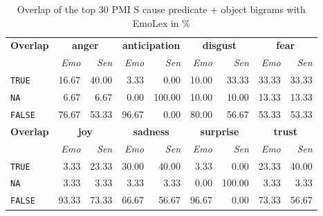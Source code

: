 \begin{table}[]
\centering
\begin{tabular}{l|rr|rr|rr|rr}
{\bf Overlap} & \multicolumn{2}{c}{{\bf anger}} & \multicolumn{2}{c}{{\bf anticipation}} & \multicolumn{2}{c}{{\bf disgust}} & \multicolumn{2}{c}{{\bf fear}} \\
 & {\it Emo} & {\it Sen} & {\it Emo} & {\it Sen} & {\it Emo} & {\it Sen} & {\it Emo} & {\it Sen} \\\hline
\texttt{TRUE} & 16.67 & 40.00 & 3.33 & 0.00 & 10.00 & 33.33 & 33.33 & 33.33 \\
\texttt{NA} & 6.67 & 6.67 & 0.00 & 100.00 & 10.00 & 10.00 & 13.33 & 13.33 \\
\texttt{FALSE} & 76.67 & 53.33 & 96.67 & 0.00 & 80.00 & 56.67 & 53.33 & 53.33 \\\hline
{\bf Overlap} & \multicolumn{2}{c}{{\bf joy}} & \multicolumn{2}{c}{{\bf sadness}} & \multicolumn{2}{c}{{\bf surprise}} & \multicolumn{2}{c}{{\bf trust}} \\
 & {\it Emo} & {\it Sen} & {\it Emo} & {\it Sen} & {\it Emo} & {\it Sen} & {\it Emo} & {\it Sen} \\\hline
\texttt{TRUE} & 3.33 & 23.33 & 30.00 & 40.00 & 3.33 & 0.00 & 23.33 & 40.00 \\
\texttt{NA} & 3.33 & 3.33 & 3.33 & 3.33 & 0.00 & 100.00 & 3.33 & 3.33 \\
\texttt{FALSE} & 93.33 & 73.33 & 66.67 & 56.67 & 96.67 & 0.00 & 73.33 & 56.67
\end{tabular}
\caption{Overlap of the top 30 PMI S cause predicate + object bigrams with EmoLex in \%}
\label{tab:s-cause-pred-dobj-nrc-overlap}
\end{table}

